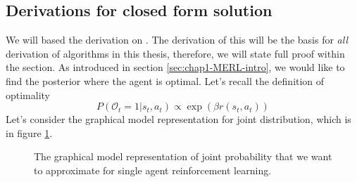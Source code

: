 \subsection{Derivations for closed form solution}
\label{sec:chap2-derivation-soft-closed-form}

We will based the derivation on \cite{levine2018reinforcement}. The derivation of this will be the basis for \textit{all} derivation of algorithms in this thesis, therefore, we will state full proof within the section. As introduced in section \ref{sec:chap1-MERL-intro}, we would like to find the posterior where the agent is optimal. Let's recall the definition of optimality 
\begin{equation}
    P(\mathcal{O}_t = 1 | s_t, a_t) \propto \exp (\beta r (s_t, a_t))
\end{equation}
Let's consider the graphical model representation for joint distribution, which is in figure \ref{fig:chap2-single-graphical-optim}. 
\begin{figure}[ht]
    \begin{minipage}[t]{0.5\linewidth}
    \centering
    \end{minipage}%
    \begin{minipage}[t]{0.5\linewidth}
    \caption{The graphical model representation of joint probability that we want to approximate for single agent reinforcement learning.}
    \label{fig:chap2-single-graphical-optim}
    \end{minipage}
\end{figure}
